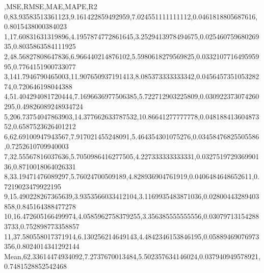 ,MSE,RMSE,MAE,MAPE,R2
0,83.93583513361123,9.161422859492959,7.024551111111112,0.0461818805687616,0.8015438000384023
1,17.60831631319896,4.1957874772861645,3.2529413978494675,0.02546075968026935,0.8035863584111925
2,48.56827808647836,6.966440214876102,5.5980618279569825,0.033210771649595995,0.7764151900733077
3,141.7946790465003,11.907650937191413,8.085373333333342,0.045645735105328274,0.720646198044388
4,51.404294081720444,7.1696636977506385,5.722712903225809,0.030922373074260295,0.49826089248934724
5,206.73754047863903,14.377662633787532,10.86641277777778,0.04818841360487352,0.6587523626401212
6,62.69100947943567,7.917021455248091,5.464354301075276,0.03458476825505586,0.7252610709940003
7,32.55567816037636,5.7050986416277505,4.227333333333331,0.032751972936990136,0.8710018064026331
8,33.19471476089297,5.76024700509189,4.828936904761919,0.0406484648652611,0.7219023479922195
9,15.490228267365639,3.9353566033412104,3.1169935483871036,0.02800443289403858,0.845164388477278
10,16.472605166499974,4.0585962758379255,3.356385555555556,0.030797131542883733,0.752898773358857
11,37.580558017371914,6.130256214649143,4.4842346153846195,0.05889469076973356,0.8024014341292144
Mean,62.33614474934092,7.2737670013484,5.502357634146024,0.037940949578921,0.7481528852542468
